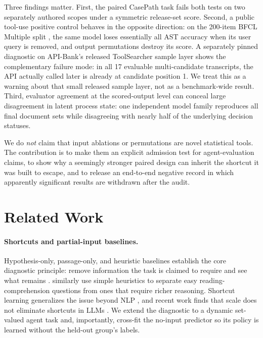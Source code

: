 \documentclass{article}
\begin{document}
Three findings matter. First, the paired CasePath task fails both tests on two separately authored scopes under a symmetric release-set score. Second, a public tool-use positive control behaves in the opposite direction: on the 200-item BFCL Multiple split \citep{patil2025bfcl}, the same model loses essentially all AST accuracy when its user query is removed, and output permutations destroy its score. A separately pinned diagnostic on API-Bank's released ToolSearcher sample layer \citep{li2023apibank} shows the complementary failure mode: in all 17 evaluable multi-candidate transcripts, the API actually called later is already at candidate position 1. We treat this as a warning about that small released sample layer, not as a benchmark-wide result. Third, evaluator agreement at the scored-output level can conceal large disagreement in latent process state: one independent model family reproduces all final document sets while disagreeing with nearly half of the underlying decision statuses.

We do \emph{not} claim that input ablations or permutations are novel statistical tools. The contribution is to make them an explicit admission test for agent-evaluation claims, to show why a seemingly stronger paired design can inherit the shortcut it was built to escape, and to release an end-to-end negative record in which apparently significant results are withdrawn after the audit.

\section{Related Work}
\paragraph{Shortcuts and partial-input baselines.}
Hypothesis-only, passage-only, and heuristic baselines establish the core diagnostic principle: remove information the task is claimed to require and see what remains \citep{kaushik2018reading,poliak2018hypothesis,gururangan2018artifacts,mccoy2019hans}. \citet{sugawara2018easier} similarly use simple heuristics to separate easy reading-comprehension questions from ones that require richer reasoning. Shortcut learning generalizes the issue beyond NLP \citep{geirhos2020shortcut}, and recent work finds that scale does not eliminate shortcuts in LLMs \citep{yuan2024shortcut}. We extend the diagnostic to a dynamic set-valued agent task and, importantly, cross-fit the no-input predictor so its policy is learned without the held-out group's labels.
\end{document}
